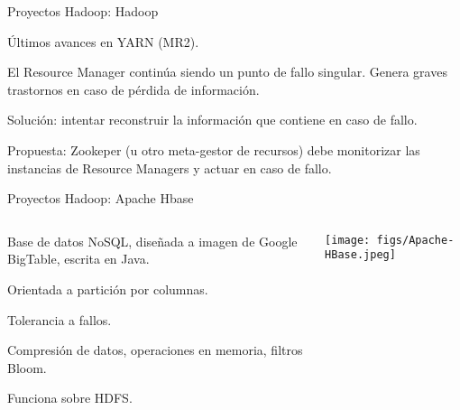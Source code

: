 
\begin{frame}{Proyectos Hadoop: Hadoop}
 \begin{wideitemize}
  \item Últimos avances en YARN (MR2).
  
  \item El Resource Manager continúa siendo un punto de fallo singular. Genera
  graves trastornos en caso de pérdida de información.
  
  \item Solución: intentar reconstruir la información que contiene en caso de fallo.
  
  \item Propuesta: Zookeper (u otro meta-gestor de recursos) debe monitorizar las
  instancias de Resource Managers y actuar en caso de fallo.

 \end{wideitemize}

\end{frame}



\begin{frame}{Proyectos Hadoop: Apache Hbase}
 \begin{columns}[T]
    \begin{column}{.75\textwidth}
     \begin{wideitemize}
      \item Base de datos NoSQL, diseñada a imagen de Google BigTable, escrita
      en Java.
      \item Orientada a partición por columnas.
      \item Tolerancia a fallos.
      \item Compresión de datos, operaciones en memoria, filtros Bloom.
      \item Funciona sobre HDFS.

    \end{wideitemize}
    \end{column}
    \begin{column}{.25\textwidth}
    \vspace*{.7cm}
    \texttt{[image: figs/Apache-HBase.jpeg]}
    \end{column}
  \end{columns}

\end{frame}



